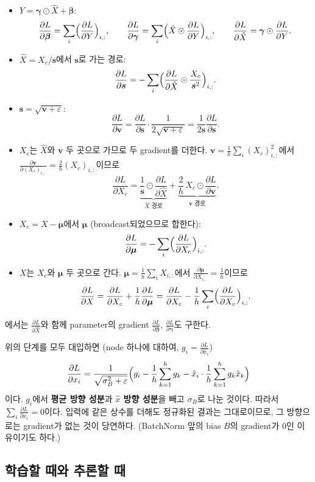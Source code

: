 \documentclass[11pt,a4paper]{article}
\newcommand{\pd}[2]{\frac{\partial #1}{\partial #2}}
\begin{document}
\begin{itemize}[leftmargin=2.2em,itemsep=0.5em]
\item[\ding{173}] $Y=\bm\gamma\odot\hat X+\bm\beta$:
\[
\pd{L}{\bm\beta}=\sum_{i}\Bigl(\pd{L}{Y}\Bigr)_{i,:},\qquad
\pd{L}{\bm\gamma}=\sum_{i}\Bigl(\hat X\odot\pd{L}{Y}\Bigr)_{i,:},\qquad
\pd{L}{\hat X}=\bm\gamma\odot\pd{L}{Y}.
\]
\item[\ding{174}] $\hat X=X_c/\bm s$에서 $\bm s$로 가는 경로:
\[
\pd{L}{\bm s}=-\sum_i\Bigl(\pd{L}{\hat X}\odot\frac{X_c}{\bm s^2}\Bigr)_{i,:}.
\]
\item[\ding{175}] $\bm s=\sqrt{\bm v+\varepsilon}$:
\[
\pd{L}{\bm v}=\pd{L}{\bm s}\cdot\frac{1}{2\sqrt{\bm v+\varepsilon}}=\frac{1}{2\bm s}\pd{L}{\bm s}.
\]
\item[\ding{176}] $X_c$는 $\hat X$와 $\bm v$ 두 곳으로 가므로 두 gradient를 더한다.
$\bm v=\frac1h\sum_i (X_c)_{i,:}^2$에서 $\pd{\bm v}{(X_c)_{i,:}}=\frac2h(X_c)_{i,:}$이므로
\[
\pd{L}{X_c}=\underbrace{\frac{1}{\bm s}\odot\pd{L}{\hat X}}_{\hat X\text{ 경로}}
+\underbrace{\frac2h\,X_c\odot\pd{L}{\bm v}}_{\bm v\text{ 경로}}.
\]
\item[\ding{177}] $X_c=X-\bm\mu$에서 $\bm\mu$ (broadcast되었으므로 합한다):
\[
\pd{L}{\bm\mu}=-\sum_i\Bigl(\pd{L}{X_c}\Bigr)_{i,:}.
\]
\item[\ding{178}] $X$는 $X_c$와 $\bm\mu$ 두 곳으로 간다. $\bm\mu=\frac1h\sum_iX_{i,:}$에서 $\pd{\bm\mu}{X_{i,:}}=\frac1h$이므로
\[
\pd{L}{X}=\pd{L}{X_c}+\frac1h\pd{L}{\bm\mu}
=\pd{L}{X_c}-\frac1h\sum_i\Bigl(\pd{L}{X_c}\Bigr)_{i,:}.
\]
\end{itemize}
에서는 $\pd{L}{\hat X}$와 함께 parameter의 gradient $\pd{L}{\bm\beta}$, $\pd{L}{\bm\gamma}$도 구한다.

\begin{remarkbox}[한 줄로 정리한 $\pd{L}{X}$]
위의 단계를 모두 대입하면 (node 하나에 대하여, $g_i=\pd{L}{\hat x_i}$)
\[
\pd{L}{x_i}=\frac{1}{\sqrt{\sigma_B^2+\varepsilon}}
\Bigl(g_i-\frac1h\sum_{k=1}^{h}g_k-\hat x_i\cdot\frac1h\sum_{k=1}^{h}g_k\hat x_k\Bigr)
\]
이다. $g_i$에서 \textbf{평균 방향 성분}과 \textbf{$\hat x$ 방향 성분}을 빼고 $\sigma_B$로 나눈 것이다.
따라서 $\sum_i\pd{L}{x_i}=0$이다. 입력에 같은 상수를 더해도 정규화된 결과는 그대로이므로,
그 방향으로는 gradient가 없는 것이 당연하다. (BatchNorm 앞의 bias $B$의 gradient가 $0$인 이유이기도 하다.)
\end{remarkbox}

\subsection{학습할 때와 추론할 때}\label{sec:bntest}
\end{document}
